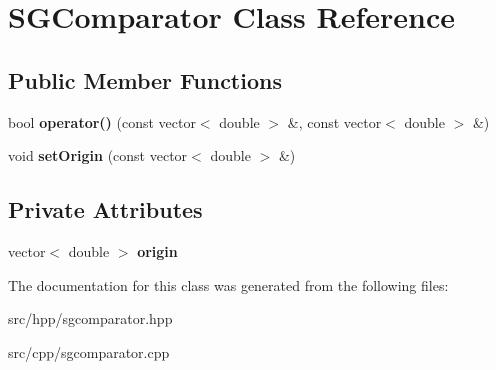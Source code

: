 \hypertarget{class_s_g_comparator}{\section{S\+G\+Comparator Class Reference}
\label{class_s_g_comparator}
}
\subsection*{Public Member Functions}
\begin{DoxyCompactItemize}
\item 
\hypertarget{class_s_g_comparator_a16f872e1006a2a0f961c2d75f76eb09b}{bool {\bfseries operator()} (const vector$<$ double $>$ \&, const vector$<$ double $>$ \&)}\label{class_s_g_comparator_a16f872e1006a2a0f961c2d75f76eb09b}

\item 
\hypertarget{class_s_g_comparator_a8d148427c21d0e7d1283b368548c0a28}{void {\bfseries set\+Origin} (const vector$<$ double $>$ \&)}\label{class_s_g_comparator_a8d148427c21d0e7d1283b368548c0a28}

\end{DoxyCompactItemize}
\subsection*{Private Attributes}
\begin{DoxyCompactItemize}
\item 
\hypertarget{class_s_g_comparator_a7a41e74bc94593a9acbe9e21b6155310}{vector$<$ double $>$ {\bfseries origin}}\label{class_s_g_comparator_a7a41e74bc94593a9acbe9e21b6155310}

\end{DoxyCompactItemize}


The documentation for this class was generated from the following files\+:\begin{DoxyCompactItemize}
\item 
src/hpp/sgcomparator.\+hpp\item 
src/cpp/sgcomparator.\+cpp\end{DoxyCompactItemize}
